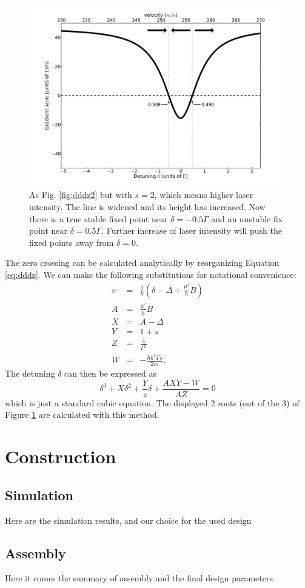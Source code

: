 \documentclass[12pt,a4paper]{article}
\begin{document}
\begin{figure}[htb]
\centering
\includegraphics[width=1.0\textwidth]{detu3}
\caption{As Fig. \ref{fig:dddz2} but with $s = 2$, which means higher laser intensity. The line is widened and its height has increased. Now there is a true stable fixed point near $\delta = -0.5 \Gamma$ and an unstable fix point near $\delta = 0.5 \Gamma$. Further increase of laser intensity will push the fixed points away from $\delta = 0$.}
\label{fig:dddz3}
\end{figure}

The zero crossing can be calculated analytically by reorganizing Equation \ref{eq:dddz}. We can make the following substitutions for notational convenience:
\begin{eqnarray}
v &=& \frac{1}{k}\left(\delta - \Delta + \frac{\mu'}{\hbar}B\right) \\
A &=& \frac{\mu'}{\hbar}B \\
X &=& A - \Delta \\
Y &=& 1+s \\
Z &=& \frac{4}{\Gamma^2} \\
W &=& - \frac{\hbar k^3 \Gamma s}{2 m}.
\end{eqnarray}
The detuning $\delta$ can then be expressed as
\begin{equation}
\delta^3 + X \delta^2 + \frac{Y}{z} \delta + \frac{A X Y - W}{A Z}= 0
\end{equation}
which is just a standard cubic equation. The displayed 2 roots (out of the 3) of Figure \ref{fig:dddz3} are calculated with this method.

\section{Construction}

\subsection{Simulation}

Here are the simulation results, and our choice for the used design

\subsection{Assembly}

Here it comes the summary of assembly and the final design parameters





\end{document}
